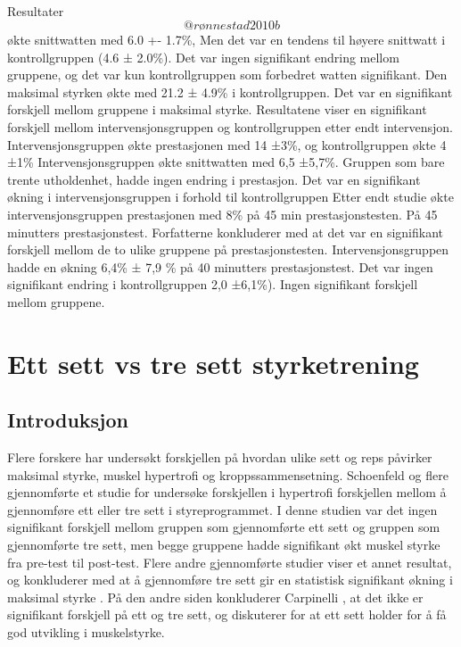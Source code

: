 \documentclass[
]{book}
\begin{document}
\hypertarget{section}{%
\section{}\label{section}}

Resultater \[@rønnestad2010b\] økte snittwatten med 6.0 +- 1.7\%, Men det var en tendens til høyere snittwatt i kontrollgruppen (4.6 ± 2.0\%). Det var ingen signifikant endring mellom gruppene, og det var kun kontrollgruppen som forbedret watten signifikant. Den maksimal styrken økte med 21.2 ± 4.9\% i kontrollgruppen. Det var en signifikant forskjell mellom gruppene i maksimal styrke. \citet{rønnestad2010a} Resultatene viser en signifikant forskjell mellom intervensjonsgruppen og kontrollgruppen etter endt intervensjon. Intervensjonsgruppen økte prestasjonen med 14 ±3\%, og kontrollgruppen økte 4 ±1\% \citet{rønnestad2015} Intervensjonsgruppen økte snittwatten med 6,5 ±5,7\%. Gruppen som bare trente utholdenhet, hadde ingen endring i prestasjon. Det var en signifikant økning i intervensjonsgruppen i forhold til kontrollgruppen \citet{aagaard2011} Etter endt studie økte intervensjonsgruppen prestasjonen med 8\% på 45 min prestasjonstesten. På 45 minutters prestasjonstest. Forfatterne konkluderer med at det var en signifikant forskjell mellom de to ulike gruppene på prestasjonstesten. \citet{vikmoen2016} Intervensjonsgruppen hadde en økning 6,4\% ± 7,9 \% på 40 minutters prestasjonstest. Det var ingen signifikant endring i kontrollgruppen 2,0 ±6,1\%). Ingen signifikant forskjell mellom gruppene.

\hypertarget{ett-sett-vs-tre-sett-styrketrening}{%
\chapter{Ett sett vs tre sett styrketrening}\label{ett-sett-vs-tre-sett-styrketrening}}

\hypertarget{introduksjon-1}{%
\section{Introduksjon}\label{introduksjon-1}}

Flere forskere har undersøkt forskjellen på hvordan ulike sett og reps påvirker maksimal styrke, muskel hypertrofi og kroppssammensetning. Schoenfeld og flere \citep{2019} gjennomførte et studie for undersøke forskjellen i hypertrofi forskjellen mellom å gjennomføre ett eller tre sett i styreprogrammet. I denne studien var det ingen signifikant forskjell mellom gruppen som gjennomførte ett sett og gruppen som gjennomførte tre sett, men begge gruppene hadde signifikant økt muskel styrke fra pre-test til post-test. Flere andre gjennomførte studier viser et annet resultat, og konkluderer med at å gjennomføre tre sett gir en statistisk signifikant økning i maksimal styrke \citep{rhea2002, munn2005, fröhlich2010}. På den andre siden konkluderer Carpinelli \citep{carpinelli1998}, at det ikke er signifikant forskjell på ett og tre sett, og diskuterer for at ett sett holder for å få god utvikling i muskelstyrke.
\end{document}
